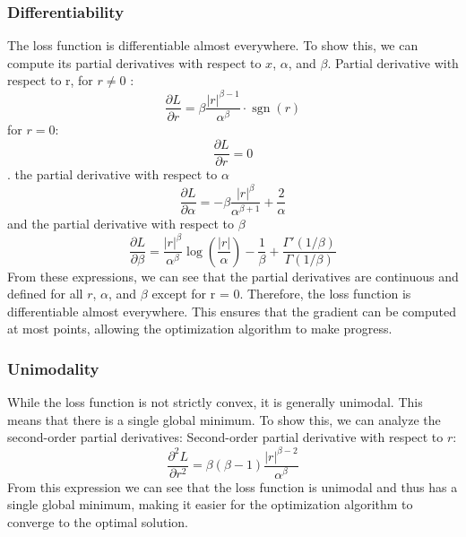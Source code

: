 \documentclass[letterpaper, 10 pt, conference]{ieeeconf}  %
\begin{document}
\subsubsection{Differentiability} 
The loss function is differentiable almost everywhere. To show this, we can compute its partial derivatives with respect to $x$, $\alpha$, and $\beta$. Partial derivative with respect to r, for $r \neq 0 $ : 
    \begin{equation*}
    \frac{\partial L}{\partial r} = \beta \frac{|r|^{\beta-1}}{\alpha^{\beta}} \cdot \operatorname{sgn}(r)
\end{equation*}
for $r=0$:
\begin{equation*}
    \frac{\partial L}{\partial r} = 0
\end{equation*} . the partial derivative with respect to $\alpha$ 
\begin{equation*}
    \frac{\partial L}{\partial \alpha} = -\beta \frac{|r|^{\beta}}{\alpha^{\beta+1}} + \frac{2}{\alpha}
\end{equation*} and
the partial derivative with respect to $\beta$ 
\begin{equation*}
    \frac{\partial L}{\partial \beta} = \frac{|r|^{\beta}}{\alpha^{\beta}} \log \left( \frac{|r|}{\alpha} \right) - \frac{1}{\beta} + \frac{\Gamma'(1/\beta)}{\Gamma(1/\beta)}
\end{equation*}
From these expressions, we can see that the partial derivatives are continuous and defined for all $r$, $\alpha$, and $\beta$ except for r = 0. Therefore, the loss function is differentiable almost everywhere. This ensures that the gradient can be computed at most points, allowing the optimization algorithm to make progress.

\subsubsection{Unimodality} 
While the loss function is not strictly convex, it is generally unimodal. This means that there is a single global minimum. To show this, we can analyze the second-order partial derivatives:
Second-order partial derivative with respect to $r$:
\begin{equation*}
    \frac{\partial^2 L}{\partial r^2} = \beta (\beta-1) \frac{|r|^{\beta-2}}{\alpha^{\beta}}
\end{equation*}
From this expression we can see that the loss function is unimodal and thus has a single global minimum, making it easier for the optimization algorithm to converge to the optimal solution.
\end{document}
